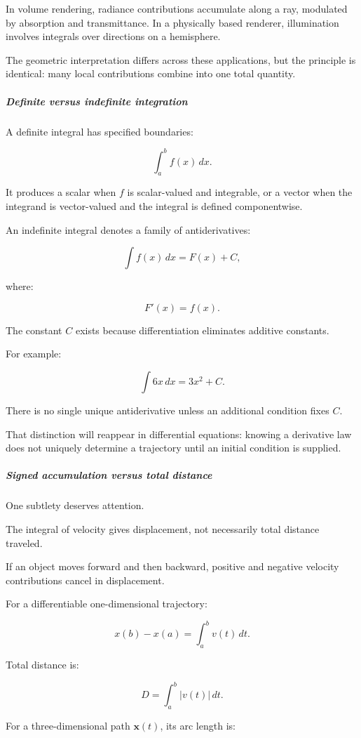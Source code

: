 In volume rendering, radiance contributions accumulate along a ray, modulated by absorption and transmittance. In a physically based renderer, illumination involves integrals over directions on a hemisphere.

The geometric interpretation differs across these applications, but the principle is identical: many local contributions combine into one total quantity.

\subparagraph{Definite versus indefinite integration}\label{definite-versus-indefinite-integration}

A definite integral has specified boundaries:

\[
\int_a^b f(x)\,dx.
\]

It produces a scalar when \(f\) is scalar-valued and integrable, or a vector when the integrand is vector-valued and the integral is defined componentwise.

An indefinite integral denotes a family of antiderivatives:

\[
\int f(x)\,dx=F(x)+C,
\]

where:

\[
F'(x)=f(x).
\]

The constant \(C\) exists because differentiation eliminates additive constants.

For example:

\[
\int 6x\,dx=3x^2+C.
\]

There is no single unique antiderivative unless an additional condition fixes \(C\).

That distinction will reappear in differential equations: knowing a derivative law does not uniquely determine a trajectory until an initial condition is supplied.

\subparagraph{Signed accumulation versus total distance}\label{signed-accumulation-versus-total-distance}

One subtlety deserves attention.

The integral of velocity gives displacement, not necessarily total distance traveled.

If an object moves forward and then backward, positive and negative velocity contributions cancel in displacement.

For a differentiable one-dimensional trajectory:

\[
x(b)-x(a)=\int_a^b v(t)\,dt.
\]

Total distance is:

\[
\boxed{D=\int_a^b|v(t)|\,dt}.
\]

For a three-dimensional path \(\mathbf x(t)\), its arc length is:

